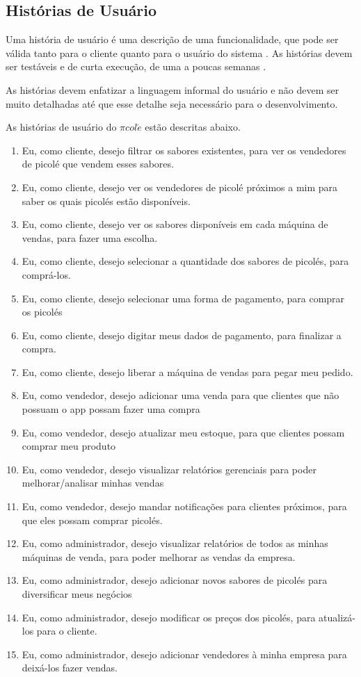 \subsection{Histórias de Usuário}
\label{sec:historias}

Uma história de usuário é uma descrição de uma funcionalidade, que pode ser válida tanto para o cliente quanto para o usuário do sistema \cite{cohn2004user}. As histórias devem ser testáveis e de curta execução, de uma a poucas semanas \cite{breitman}.

As histórias devem enfatizar a linguagem informal do usuário e não devem ser muito detalhadas até que esse detalhe seja necessário para o desenvolvimento. \cite{cohn2004advantages}

As histórias de usuário do $\pi col\acute{e}$ estão descritas abaixo.

\begin{enumerate}
\item Eu, como cliente, desejo filtrar os sabores existentes, para ver os vendedores de picolé que vendem esses sabores.
\item Eu, como cliente, desejo ver os vendedores de picolé próximos a mim para saber os quais picolés estão disponíveis.
\item Eu, como cliente, desejo ver os sabores disponíveis em cada máquina de vendas, para fazer uma escolha.
\item Eu, como cliente, desejo selecionar a quantidade dos sabores de picolés, para comprá-los.
\item Eu, como cliente, desejo selecionar uma forma de pagamento, para comprar os picolés
\item Eu, como cliente, desejo digitar meus dados de pagamento, para finalizar a compra.
\item Eu, como cliente, desejo liberar a máquina de vendas para pegar meu pedido.
\item Eu, como vendedor, desejo adicionar uma venda para que clientes que não possuam o app possam fazer uma compra
\item Eu, como vendedor, desejo atualizar meu estoque, para que clientes possam comprar meu produto
\item Eu, como vendedor, desejo visualizar relatórios gerenciais para poder melhorar/analisar minhas vendas
\item Eu, como vendedor, desejo mandar notificações para clientes próximos, para que eles possam comprar picolés.
\item Eu, como administrador, desejo visualizar relatórios de todos as minhas máquinas de venda, para poder melhorar as vendas da empresa.
\item Eu, como administrador, desejo adicionar novos sabores de picolés para diversificar meus negócios
\item Eu, como administrador, desejo modificar os preços dos picolés, para atualizá-los para o cliente.
\item Eu, como administrador, desejo adicionar vendedores à minha empresa para deixá-los fazer vendas.
\end{enumerate}


